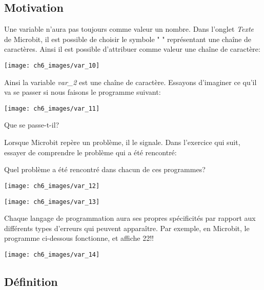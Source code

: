 \documentclass[11pt, a4paper]{book}
\begin{document}
\subsection{Motivation}

Une variable n'aura pas toujours comme valeur un nombre. Dans l'onglet {\it Texte} de Microbit, il est possible de choisir le symbole " " représentant une chaîne de caractères. Ainsi il est possible d'attribuer comme valeur une chaîne de caractère: 

\begin{center}
\texttt{[image: ch6\_images/var\_10]}
\end{center}

Ainsi la variable {\it var\_2} est une chaîne de caractère. Essayons d'imaginer ce qu'il va se passer si nous faisons le programme suivant:

\begin{center}
\texttt{[image: ch6\_images/var\_11]}
\end{center}

Que se passe-t-il?

\vskip4cm

Lorsque Microbit repère un problème, il le signale. Dans l'exercice qui suit, essayer de comprendre le problème qui a été rencontré:

\begin{exercice}
Quel problème a été rencontré dans chacun de ces programmes?

\begin{center}
\texttt{[image: ch6\_images/var\_12]}
\end{center}

\begin{center}
\texttt{[image: ch6\_images/var\_13]}
\end{center}

\end{exercice}

\begin{remarque}
Chaque langage de programmation aura ses propres spécificités par rapport aux différents types d'erreurs qui peuvent apparaître. Par exemple, en Microbit, le programme ci-dessous fonctionne, et affiche 22!!

\begin{center}
\texttt{[image: ch6\_images/var\_14]}
\end{center}
\end{remarque}

\subsection{Définition}
\end{document}
